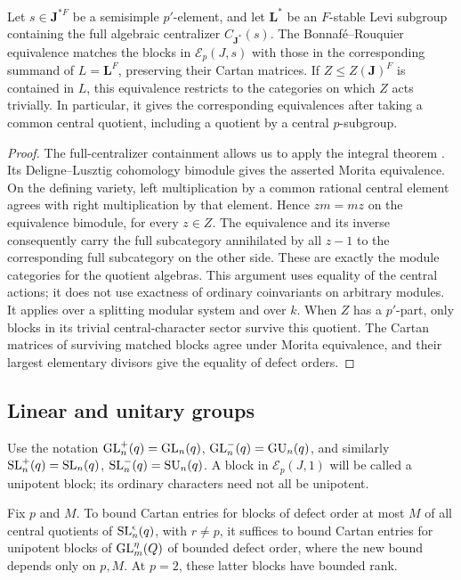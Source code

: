 \begin{lemma}
\label{fam:br-central}
Let \(s\in\mathbf J^{*F}\) be a semisimple \(p'\)-element, and let
\(\mathbf L^*\) be an \(F\)-stable Levi subgroup containing the full
algebraic centralizer \(C_{\mathbf J^*}(s)\).  The
Bonnaf\'e--Rouquier equivalence matches the blocks in
\(\mathcal E_p(J,s)\) with those in the corresponding summand of
\(L=\mathbf L^F\), preserving their Cartan matrices.
If \(Z\leq Z(\mathbf J)^F\) is contained in \(L\), this equivalence restricts
to the categories on which \(Z\) acts trivially.  In particular, it
gives the corresponding equivalences after taking a common central
quotient, including a quotient by a central \(p\)-subgroup.
\end{lemma}

\begin{proof}
The full-centralizer containment allows us to apply the integral
theorem \cite[Theorem~B$'$, Section~11.4]{BR}.
Its Deligne--Lusztig cohomology bimodule gives the asserted Morita
equivalence.  On the defining variety, left multiplication by a common
rational central element agrees with right multiplication by that
element.  Hence \(zm=mz\) on the equivalence bimodule, for every
\(z\in Z\).  The equivalence and its inverse consequently carry the
full subcategory annihilated by all \(z-1\) to the corresponding full
subcategory on the other side.  These are exactly the module
categories for the quotient algebras.  This argument uses equality of
the central actions; it does not use exactness of ordinary coinvariants
on arbitrary modules.  It applies over a splitting modular system and
over \(k\).  When \(Z\) has a \(p'\)-part, only blocks in its trivial
central-character sector survive this quotient.  The Cartan matrices
of surviving matched blocks agree under Morita equivalence, and
their largest elementary divisors give the equality of defect orders.
\end{proof}

\subsection{Linear and unitary groups}

Use the notation
\(\operatorname{GL}_n^+(q)=\operatorname{GL}_n(q)\), \(\operatorname{GL}_n^-(q)=\operatorname{GU}_n(q)\), and similarly
\(\operatorname{SL}_n^+(q)=\operatorname{SL}_n(q)\), \(\operatorname{SL}_n^-(q)=\operatorname{SU}_n(q)\).
A block in \(\mathcal E_p(J,1)\) will be called a unipotent block;
its ordinary characters need not all be unipotent.

\begin{proposition}\label{fam:type-a}
Fix \(p\) and \(M\).  To bound Cartan entries for blocks of defect
order at most \(M\) of all central quotients of
\(\operatorname{SL}_n^\epsilon(q)\), with \(r\ne p\), it suffices to bound Cartan
entries for unipotent blocks of \(\operatorname{GL}_m^\eta(Q)\) of bounded defect
order, where the new bound depends only on \(p,M\).
At \(p=2\), these latter blocks have bounded rank.
\end{proposition}

